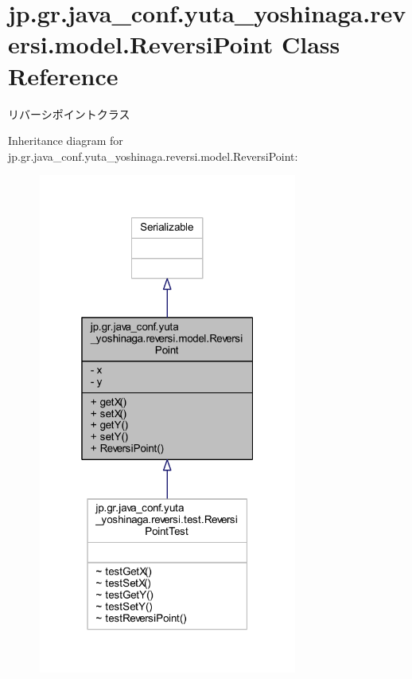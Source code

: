 \hypertarget{classjp_1_1gr_1_1java__conf_1_1yuta__yoshinaga_1_1reversi_1_1model_1_1_reversi_point}{}\section{jp.\+gr.\+java\+\_\+conf.\+yuta\+\_\+yoshinaga.\+reversi.\+model.\+Reversi\+Point Class Reference}
\label{classjp_1_1gr_1_1java__conf_1_1yuta__yoshinaga_1_1reversi_1_1model_1_1_reversi_point}


リバーシポイントクラス  




Inheritance diagram for jp.\+gr.\+java\+\_\+conf.\+yuta\+\_\+yoshinaga.\+reversi.\+model.\+Reversi\+Point\+:
\nopagebreak
\begin{figure}[H]
\begin{center}
\leavevmode
\includegraphics[width=241pt]{classjp_1_1gr_1_1java__conf_1_1yuta__yoshinaga_1_1reversi_1_1model_1_1_reversi_point__inherit__graph}
\end{center}
\end{figure}


